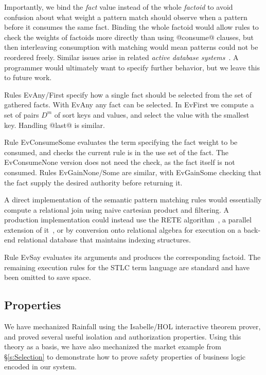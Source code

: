 Importantly, we bind the \emph{fact} value instead of the whole \emph{factoid} to avoid confusion about what weight a pattern match should observe when a pattern before it consumes the same fact. Binding the whole factoid would allow rules to check the weights of factoids more directly than using @consume@ clauses, but then interleaving consumption with matching would mean patterns could not be reordered freely. Similar issues arise in related \emph{active database systems}~\cite{Paton1999:Active}. A programmer would ultimately want to specify further behavior, but we leave this to future work.

Rules EvAny/First specify how a single fact should be selected from the set of gathered facts. With EvAny any fact can be selected. In EvFirst we compute a set of pairs $D^m$ of sort keys and values, and select the value with the smallest key. Handling @last@ is similar.

Rule EvConsumeSome evaluates the term specifying the fact weight to be consumed, and checks the current rule is in the use set of the fact. The EvConsumeNone version does not need the check, as the fact itself is not consumed. Rules EvGainNone/Some are similar, with EvGainSome checking that the fact supply the desired authority before returning it.

A direct implementation of the semantic pattern matching rules would essentially compute a relational join using naive cartesian product and filtering. A production implementation could instead use the RETE algorithm~\cite{Forgy1981:RETE, Doorenbos1995:ProductionMatching}, a parallel extension of it~\cite{Aref1998:LanaMatch}, or by conversion onto relational algebra for execution on a back-end relational database that maintains indexing structures.

Rule EvSay evaluates its arguments and produces the corresponding factoid. The remaining execution rules for the STLC term language are standard and have been omitted to save space.




\eject{}
\subsection{Properties}
We have mechanized Rainfall using the Isabelle/HOL interactive theorem prover, and proved several useful isolation and authorization properties. Using this theory as a basis, we have also mechanized the market example from \S\ref{s:Selection} to demonstrate how to prove safety properties of business logic encoded in our system.


